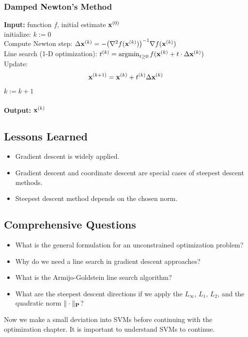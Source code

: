   \subsubsection{Damped Newton's Method}
  
  \begin{algorithmic}
    \STATE \textbf{Input:} function $f$, initial estimate $\bm{\mathrm{x}}^{(0)}$\\
    \STATE initialize: $k:=0$\\
    \Repeat
      \STATE Compute Newton step: $\Delta \bm{\mathrm{x}}^{(k)}= -\big(\nabla^2 f(\bm{\mathrm{x}}^{(k)})\big)^{-1} \nabla f(\bm{\mathrm{x}}^{(k)})$\\
      \STATE Line search (1-D optimization): $t^{(k)}= \operatorname*{argmin}_{t \geq 0}f(\bm{\mathrm{x}}^{(k)}+t\cdot \Delta\bm{\mathrm{x}}^{(k)})$\\
      \STATE Update:
        \begin{displaymath}
          \bm{\mathrm{x}}^{(k+1)} = \bm{\mathrm{x}}^{(k)} + t^{(k)}\Delta \bm{\mathrm{x}}^{(k)}
        \end{displaymath}
      \STATE $k:=k+1$\\
    \\
    \STATE \textbf{Output:} $\bm{\mathrm{x}}^{(k)}$\\
  \end{algorithmic}
 
\subsection{Lessons Learned}

  \begin{itemize}
    \item Gradient descent is widely applied.
    \item Gradient descent and coordinate descent are special cases of steepest descent methods. 
    \item Steepest descent method depends on the chosen norm.
  \end{itemize}

\subsection{Comprehensive Questions}

  \begin{itemize}
    \item What is the general formulation for an unconstrained optimization problem? 
    \item Why do we need a line search in gradient descent approaches? 
    \item What is the Armijo-Goldstein line search algorithm? 
    \item What are the steepest descent directions if we apply the $L_\infty$, $L_1$, $L_2$, and the quadratic norm $\|\cdot\|_{\mathbf{P}}$?
  \end{itemize}
Now we make a small deviation into SVMs before continuing with the optimization chapter. It is important to understand SVMs to continue.

